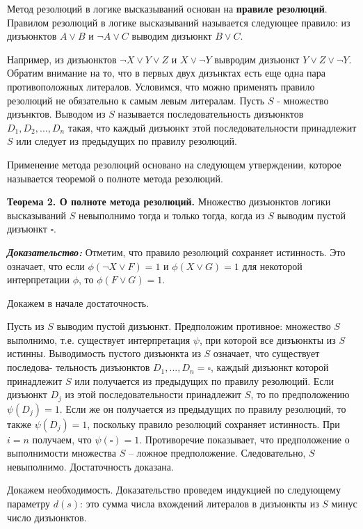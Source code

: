 \documentclass[12pt, a4paper]{article}
\begin{document}
	 \par Метод резолюций в логике высказываний основан на \textbf{правиле резолюций}. Правилом резолюций в логике высказываний называется следующее правило: из дизъюнктов $A \lor B$ и $\neg A \lor C$ выводим дизъюнкт $B \lor C$. 
	 \par Например, из дизъюнктов $\neg X \lor Y \lor Z$ и $X \lor \neg Y$ вывродим дизъюнкт $Y \lor Z \lor \neg Y$. Обратим внимание на то, что в первых двух дизънктах есть еще одна пара противоположных литералов. Условимся, что можно применять правило резолюций не обязательно к самым левым литералам. Пусть $S$ - множество дизънктов. Выводом из $S$ называется последовательность дизъюнктов $D_{1}, D_{2}, ... , D_{n}$ такая, что каждый дизъюнкт этой последовательности принадлежит $S$ или следует из предыдущих по правилу резолюций.
	 \par Применение метода резолюций основано на следующем утверждении, которое называется теоремой о полноте метода резолюций.
	 \par \textbf{Теорема 2. О полноте метода резолюций.} Множество дизъюнктов логики высказываний $S$ невыполнимо тогда и только тогда, когда из $S$ выводим пустой дизъюнкт $\square$.
	 \par \textbf{\textit{Доказательство: }}Отметим, что правило резолюций сохраняет истинность. Это означает, что если $\phi (\neg X \lor F) = 1$ и $\phi (X \lor G) = 1$ для некоторой интерпретации $\phi$, то $\phi (F \lor G) = 1$.
	 \par Докажем в начале достаточность. 
	 \par Пусть из $S$ выводим пустой дизъюнкт. Предположим противное: множество $S$ выполнимо, т.е. существует интерпретация $\psi$, при которой все дизъюнкты из $S$ истинны. Выводимость пустого дизъюнкта из $S$ означает, что существует последова-
	 тельность дизъюнктов $D_{1} , ... , D_{n} = \square$, каждый дизъюнкт которой принадлежит $S$ или получается из предыдущих по правилу резолюций. Если дизъюнкт $D_{j}$ из этой последовательности принадлежит $S$, то по предположению $\psi (D_{j}) = 1$. Если же он получается из предыдущих по правилу резолюций, то также $\psi (D_{j}) = 1$, поскольку правило резолюций сохраняет истинность. При $i = n$ получаем, что $\psi (\square) = 1$. Противоречие показывает, что предположение о выполнимости множества $S$ – ложное предположение. Следовательно, $S$ невыполнимо. Достаточность доказана.
	 \par Докажем необходимость. Доказательство проведем индукцией по следующему параметру $d(s)$: это сумма числа вхождений литералов в дизъюнкты из $S$ минус число дизъюнктов.
\end{document}
